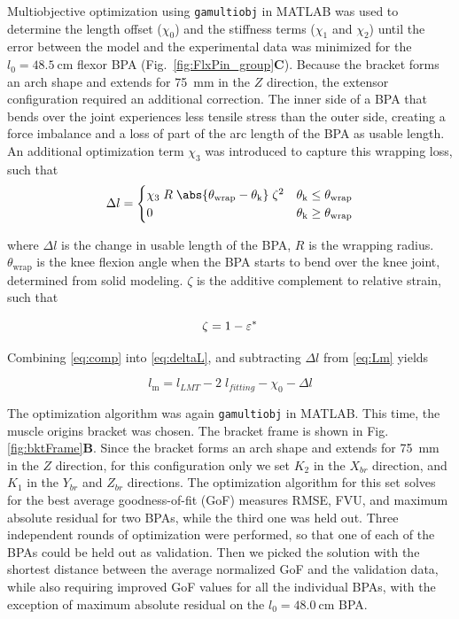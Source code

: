 Multiobjective optimization using \texttt{gamultiobj} in MATLAB was used to determine the length offset ($\chi_{0}$) and the stiffness terms ($\chi_{1}$ and $\chi_{2}$) until the error between the model and the experimental data was minimized for the $l_{0}=\qty{48.5}{\cm}$ flexor BPA (Fig.~\ref{fig:FlxPin_group}\textbf{C}). Because the bracket forms an arch shape and extends for \qty{75}{\mm} in the $Z$ direction, the extensor configuration required an additional correction. The inner side of a BPA that bends over the joint experiences less tensile stress than the outer side, creating a force imbalance and a loss of part of the arc length of the BPA as usable length. An additional optimization term $\chi_{3}$ was introduced to capture this wrapping loss, such that
\begin{equation}
    \Delta l = \begin{cases}
     \chi_{3}\;R\;\abs{ \theta_\text{wrap}-\theta_\text{k}}\;\zeta^2 & \theta_\text{k} \leq      \theta_\text{wrap} \\
      0 & \theta_\text{k} \geq \theta_\text{wrap}
     \end{cases}\label{eq:deltaL}
\end{equation}

where $\Delta l$ is the change in usable length of the BPA, $R$ is the wrapping radius. $\theta_\text{wrap}$ is the knee flexion angle when the BPA starts to bend over the knee joint, determined from solid modeling. $\zeta$ is the additive complement to relative strain, such that

\begin{equation}
    \zeta = 1-\varepsilon^*  \\
\label{eq:comp}
\end{equation}

Combining \eqref{eq:comp} into \eqref{eq:deltaL}, and subtracting $\Delta l$ from  \eqref{eq:Lm} yields

\begin{equation}
    l_\text{m} = l_{LMT} - 2\;l_{fitting}  - \chi_{0} - \Delta l\label{eq:x3}
\end{equation}

The optimization algorithm was again \texttt{gamultiobj} in MATLAB. This time, the muscle origins bracket was chosen. The bracket frame is shown in Fig. \ref{fig:bktFrame}\textbf{B}. Since the bracket forms an arch shape and extends for \qty{75}{\mm} in the $Z$ direction, for this configuration only we set $K_{2}$ in the $X_{br}$ direction, and $K_{1}$ in the $Y_{br}$ and $Z_{br}$ directions. The optimization algorithm for this set solves for the best average goodness-of-fit (GoF) measures RMSE, FVU, and maximum absolute residual for two BPAs, while the third one was held out. Three independent rounds of optimization were performed, so that one of each of the BPAs could be held out as validation. Then we picked the solution with the shortest distance between the average normalized GoF and the validation data, while also requiring improved GoF values for all the individual BPAs, with the exception of maximum absolute residual on the $l_{0}=\qty{48.0}{\cm}$ BPA.

